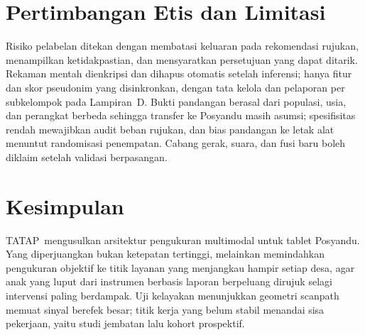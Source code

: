 \documentclass[10pt,letterpaper]{article}
\newcommand{\produk}{TATAP}
\begin{document}
\section{Pertimbangan Etis dan Limitasi}

Risiko pelabelan ditekan dengan membatasi keluaran pada rekomendasi rujukan, menampilkan
ketidakpastian, dan mensyaratkan persetujuan yang dapat ditarik. Rekaman mentah dienkripsi dan
dihapus otomatis setelah inferensi; hanya fitur dan skor pseudonim yang disinkronkan, dengan
tata kelola dan pelaporan per subkelompok pada Lampiran~D.
Bukti pandangan berasal dari populasi, usia, dan perangkat berbeda sehingga transfer ke
Posyandu masih asumsi; spesifisitas rendah mewajibkan audit beban rujukan, dan bias pandangan
ke letak alat menuntut randomisasi penempatan. Cabang gerak, suara, dan fusi baru boleh
diklaim setelah validasi berpasangan.

\section{Kesimpulan}

\produk\ mengusulkan arsitektur pengukuran multimodal untuk tablet Posyandu. Yang
diperjuangkan bukan ketepatan tertinggi, melainkan memindahkan pengukuran objektif ke titik
layanan yang menjangkau hampir setiap desa, agar anak yang luput dari instrumen berbasis
laporan berpeluang dirujuk selagi intervensi paling berdampak. Uji kelayakan menunjukkan
geometri scanpath memuat sinyal berefek besar; titik kerja yang belum stabil menandai sisa
pekerjaan, yaitu studi jembatan lalu kohort prospektif.
\end{document}
